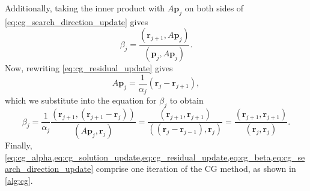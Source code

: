 Additionally, taking the inner product with $A \mathbf{p}_j$ on both sides of \cref{eq:cg_search_direction_update} gives
\[
  \beta_j = \frac{(\mathbf{r}_{j+1}, A \mathbf{p}_j)}{(\mathbf{p}_j, A \mathbf{p}_j)}.
\]
Now, rewriting \cref{eq:cg_residual_update} gives
\[
  A \mathbf{p}_j = \frac{1}{\alpha_j} (\mathbf{r}_j - \mathbf{r}_{j+1}),
\]
which we substitute into the equation for $\beta_j$ to obtain
\begin{equation}
  \beta_j = \frac{1}{\alpha_j}\frac{(\mathbf{r}_{j+1}, (\mathbf{r}_{j+1}-\mathbf{r}_j))}{(A \mathbf{p}_j, \mathbf{r}_j)} = \frac{(\mathbf{r}_{j+1},\mathbf{r}_{j+1})}{((\mathbf{r}_j - \mathbf{r}_{j-1}), \mathbf{r}_j)} = \frac{(\mathbf{r}_{j+1},\mathbf{r}_{j+1})}{(\mathbf{r}_j, \mathbf{r}_j)}.
  \label{eq:cg_beta}
\end{equation}
Finally, \cref{eq:cg_alpha,eq:cg_solution_update,eq:cg_residual_update,eq:cg_beta,eq:cg_search_direction_update} comprise one iteration of the CG method, as shown in \cref{alg:cg}.
